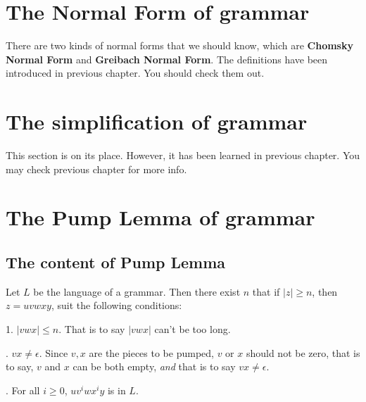 \documentclass[../main.tex]{subfiles}
\begin{document}
\section{The Normal Form of grammar}
\label{sec:The Normal Form of grammar}

There are two kinds of normal forms that we should know, which are \textbf{Chomsky Normal Form} and \textbf{Greibach Normal Form}. 
The definitions have been introduced in previous chapter. You should check them out.

\section{The simplification of grammar}
\label{sec:The simplification of grammar}

This section is on its place. However, it has been learned in previous chapter. You may 
check previous chapter for more info.
\section{The Pump Lemma of grammar}
\label{sec:The Pump Lemma of grammar}

\subsection{The content of Pump Lemma}
\begin{thm}
\label{Pump Lemma}
Let \(L \) be the language of a grammar. Then there exist \(n\) that if \(|z| \ge n\), then \(z = uvwxy\), suit the following 
conditions: 

	\bigskip
	\setlength{\hangindent}{33pt}
	1. \(| v w x | \le n\). That is to say \( |v  w x |  \) can't be too long.

	. \(v x \ne\epsilon\). Since \(v,  x \) are the pieces to be pumped, \(v\) or \(x\) should not be zero, that is to 
	say, \(v\) and \(x\) can be both empty, \emph{and} that is to say \( v x \ne\epsilon\).

	. For all \(i \ge 0\), \(u v ^{i} w x ^{i} y\) is in \(L\).
\end{thm}
\end{document}

